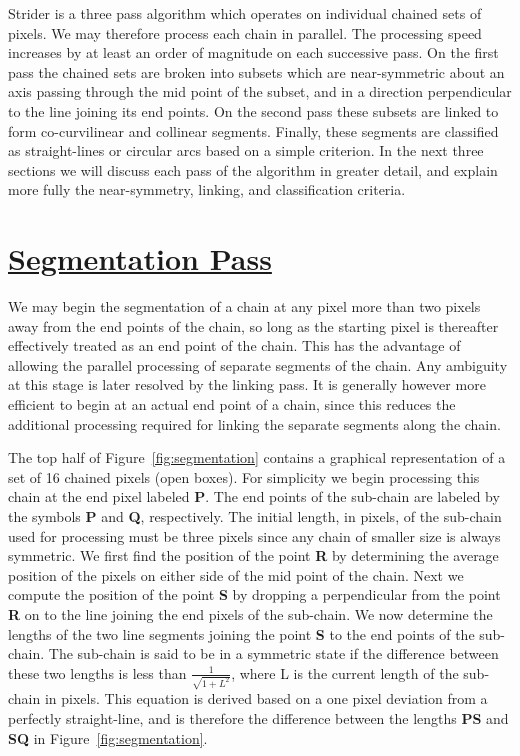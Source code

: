  Strider is a three pass algorithm which operates on individual chained sets
of pixels. We may therefore process each chain in parallel. The processing
speed increases by at least an order of magnitude on each successive pass. 
On the first pass the chained sets are broken into subsets which are
near-symmetric about an axis passing through the mid point of the subset, and 
in a direction perpendicular to the line joining its end points. On the second 
pass these subsets are linked to form co-curvilinear and collinear segments. 
Finally, these segments are classified as straight-lines or circular arcs 
based on a simple criterion. In the next three sections we will discuss each 
pass of the algorithm in greater detail, and explain more fully the 
near-symmetry, linking, and classification criteria.

\section{\underline{Segmentation Pass}}

 We may begin the segmentation of a chain at any pixel more than two pixels
away from the end points of the chain, so long as the starting pixel is
thereafter effectively treated as an end point of the chain. This has the 
advantage of allowing the parallel processing of separate segments of the 
chain. Any ambiguity at this stage is later resolved by the linking pass. 
It is generally however more efficient to begin at an actual end point of a 
chain, since this reduces the additional processing required for linking the 
separate segments along the chain. 

 The top half of Figure~\ref{fig:segmentation} contains a graphical 
representation of a set of 16 chained pixels (open boxes). For simplicity we 
begin processing this chain at the end pixel labeled {\bf P}. The end points 
of the sub-chain are labeled by the symbols {\bf P} and {\bf Q}, respectively. 
The initial length, in pixels, of the sub-chain used for processing must be 
three pixels since any chain of smaller size is always symmetric. We first 
find the position of the point {\bf R} by determining the average position of 
the pixels on either side of the mid point of the chain. Next we compute the 
position of the point {\bf S} by dropping a perpendicular from the point 
{\bf R} on to the line joining the end pixels of the sub-chain. We now 
determine the lengths of the two line segments joining the point {\bf S} to 
the end points of the sub-chain. The sub-chain is said to be in a 
symmetric state if the difference between these two lengths is less than 
$\frac{1}{\sqrt{1+L^2}}$, where L is the current length of the sub-chain in 
pixels. This equation is derived based on a one pixel deviation from a 
perfectly straight-line, and is therefore the difference between the lengths 
{\bf PS} and {\bf SQ} in Figure~\ref{fig:segmentation}.

